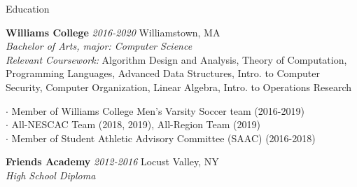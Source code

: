 \documentclass{resume} %
\begin{document}

\begin{rSection}{Education}

{\bf Williams College}  {\textit{ 2016-2020}} \hfill Williamstown, MA \\ 
\textit{ Bachelor of Arts, major: Computer Science }\\
\textit{Relevant Coursework:} Algorithm Design and Analysis, Theory of Computation, Programming Languages, Advanced Data Structures, Intro. to Computer Security, Computer Organization, Linear Algebra, Intro. to Operations Research 

$\cdot$ Member of Williams College Men’s Varsity Soccer team (2016-2019) \\
$\cdot$ All-NESCAC Team (2018, 2019), All-Region Team (2019) \\
$\cdot$  Member of Student Athletic Advisory Committee (SAAC) (2016-2018)

\vspace{0.2mm}
{\bf Friends Academy} {\textit{ 2012-2016}}  \hfill Locust Valley, NY\\ 
{\em High School Diploma } 

\end{rSection}

\end{document}
